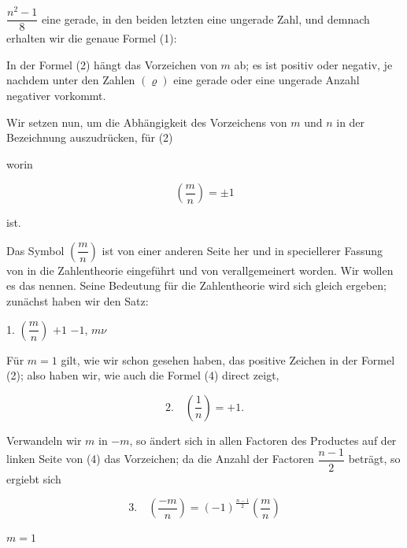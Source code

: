 $\dfrac{n^2-1}{8}$ eine gerade, in den beiden letzten eine ungerade Zahl,
und demnach erhalten wir die genaue Formel (1):


In der Formel (2) hängt das Vorzeichen von $m$ ab; es ist
positiv oder negativ, je nachdem unter den Zahlen $(\varrho)$ eine
gerade oder eine ungerade Anzahl negativer vorkommt.

Wir setzen nun, um die Abhängigkeit des Vorzeichens von
$m$ und $n$ in der Bezeichnung auszudrücken, für (2)


worin

\[
\left(\frac{m}{n}\right) = \pm 1
\]

ist.

Das Symbol $\left(\dfrac{m}{n}\right)$ ist von einer anderen Seite her und in
speciellerer Fassung von  in die Zahlentheorie eingeführt
 und von  verallgemeinert worden. Wir wollen
es das  nennen. Seine Bedeutung für
die Zahlentheorie wird sich gleich ergeben; zunächst haben
wir den Satz:

1.  $\left(\dfrac{m}{n}\right)$  $+1$  $-1$,
 $m\nu$ 

Für $m = 1$ gilt, wie wir schon gesehen haben, das positive
Zeichen in der Formel (2); also haben wir, wie auch die
Formel (4) direct zeigt,

\[
2.\quad \left(\frac{1}{n}\right) = +1.
\]

Verwandeln wir $m$ in $-m$, so ändert sich in allen Factoren
des Productes auf der linken Seite von (4) das Vorzeichen; da
die Anzahl der Factoren $\dfrac{n-1}{2}$ beträgt, so ergiebt sich

\[
3.\quad \left(\frac{-m}{n}\right) = (-1)^{\frac{n-1}{2}} \left(\frac{m}{n}\right)
\]

 $m = 1$
